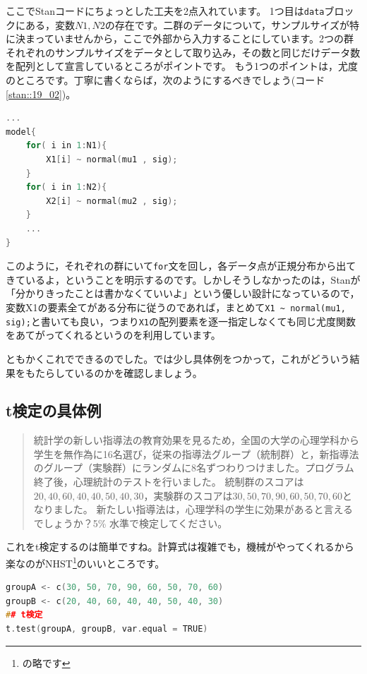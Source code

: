 \documentclass{ltjsbook}
\begin{document}
ここでStanコードにちょっとした工夫を2点入れています。
1つ目は\texttt{data}ブロックにある，変数$N1,N2$の存在です。二群のデータについて，サンプルサイズが特に決まっていませんから，ここで外部から入力することにしています。2つの群それぞれのサンプルサイズをデータとして取り込み，その数と同じだけデータ数を配列として宣言しているところがポイントです。
もう1つのポイントは，尤度のところです。丁寧に書くならば，次のようにするべきでしょう(コード\ref{stan::19_02})。
\begin{lstlisting}[language=C++,label={stan::19_02},caption={丁寧な尤度の記載}]
    ...
model{
    for( i in 1:N1){
        X1[i] ~ normal(mu1 , sig);
    }
    for( i in 1:N2){
        X2[i] ~ normal(mu2 , sig);
    }
    ...
}

\end{lstlisting}

このように，それぞれの群にいて\texttt{for}文を回し，各データ点が正規分布から出てきているよ，ということを明示するのです。しかしそうしなかったのは，Stanが「分かりきったことは書かなくていいよ」という優しい設計になっているので，変数X1の要素全てがある分布に従うのであれば，まとめて\verb|X1 ~ normal(mu1, sig);|と書いても良い，つまり\verb|X1|の配列要素を逐一指定しなくても同じ尤度関数をあてがってくれるというのを利用しています。

ともかくこれでできるのでした。では少し具体例をつかって，これがどういう結果をもたらしているのかを確認しましょう。
\subsection{t検定の具体例}
\begin{quote}
統計学の新しい指導法の教育効果を見るため，全国の大学の心理学科から学生を無作為に16名選び，従来の指導法グループ（統制群）と，新指導法のグループ（実験群）にランダムに8名ずつわりつけました。プログラム終了後，心理統計のテストを行いました。
統制群のスコアは$20, 40, 60, 40, 40, 50, 40, 30$，実験群のスコアは$30, 50, 70, 90, 60, 50, 70, 60$となりました。
新たしい指導法は，心理学科の学生に効果があると言えるでしょうか？5\% 水準で検定してください。
\end{quote}

これをt検定するのは簡単ですね。計算式は複雑でも，機械がやってくれるから楽なのがNHST\footnote{の略です}のいいところです。
\begin{lstlisting}[language=c++,label={code::19_03},caption={帰無仮説検定のコード}]
groupA <- c(30, 50, 70, 90, 60, 50, 70, 60)
groupB <- c(20, 40, 60, 40, 40, 50, 40, 30)
## t検定
t.test(groupA, groupB, var.equal = TRUE)
\end{lstlisting}
\end{document}
